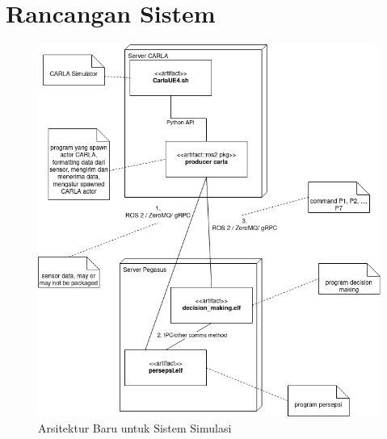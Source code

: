\chapter{Rancangan Sistem}\label{appendix-arsitektur-baru}
\setcounter{section}{1}
\begin{figure}[ht]
	\centering
	\includegraphics[width=1.0\textwidth]{resources/appendix-1-deployment diagram.png}
	\caption{Arsitektur Baru untuk Sistem Simulasi}
\end{figure}